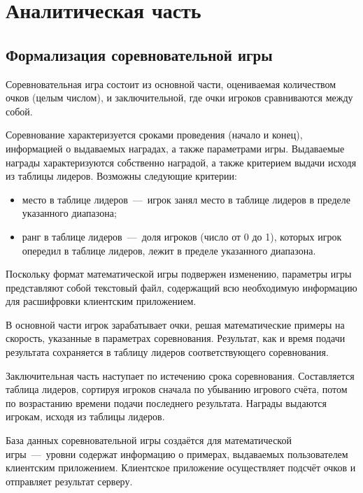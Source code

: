 \chapter{Аналитическая часть}

\section{Формализация соревновательной игры}


Соревновательная игра состоит из основной части, оцениваемая количеством очков (целым числом), и заключительной, где очки игроков сравниваются между собой.

Соревнование характеризуется сроками проведения (начало и конец), информацией о выдаваемых наградах, а также параметрами игры. Выдаваемые награды характеризуются собственно наградой, а также критерием выдачи исходя из таблицы лидеров. Возможны следующие критерии:
\begin{itemize}
	\item место в таблице лидеров~---~игрок занял место в таблице лидеров в пределе указанного диапазона;
	\item ранг в таблице лидеров~---~доля игроков (число от 0 до 1), которых игрок опередил в таблице лидеров, лежит в пределе указанного диапазона.
\end{itemize}
Поскольку формат математической игры подвержен изменению, параметры игры представляют собой текстовый файл, содержащий всю необходимую информацию для расшифровки клиентским приложением.



В основной части игрок зарабатывает очки, решая математические примеры на скорость, указанные в параметрах соревнования. Результат, как и время подачи результата сохраняется в таблицу лидеров соответствующего соревнования.

Заключительная часть наступает по истечению срока соревнования. Составляется таблица лидеров, сортируя игроков сначала по убыванию игрового счёта, потом по возрастанию времени подачи последнего результата. Награды выдаются игрокам, исходя из таблицы лидеров. 

База данных соревновательной игры создаётся для математической игры~---~уровни содержат информацию о примерах, выдаваемых пользователем клиентским приложением. Клиентское приложение осуществляет подсчёт очков и отправляет результат серверу.

